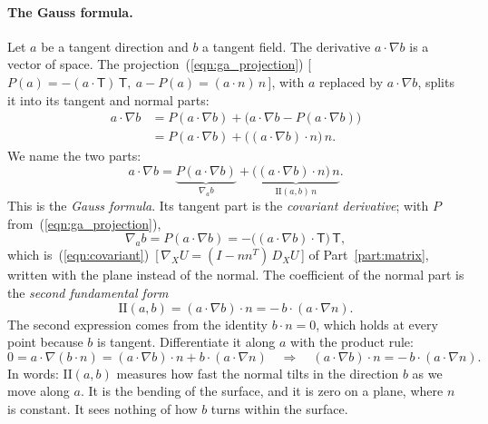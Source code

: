 \paragraph{The Gauss formula.} Let $a$ be a tangent direction and $b$ a tangent field. The derivative $a\cdot\nabla b$ is a vector of space. The projection~(\ref{eqn:ga_projection}) [\,$P(a) = -(a\cdot\mathsf T)\,\mathsf T,\ a - P(a) = (a\cdot n)\,n$\,], with $a$ replaced by $a\cdot\nabla b$, splits it into its tangent and normal parts:
\begin{align*}
a\cdot\nabla b &= P(a\cdot\nabla b) + \big(a\cdot\nabla b - P(a\cdot\nabla b)\big) \\
&= P(a\cdot\nabla b) + \big((a\cdot\nabla b)\cdot n\big)\, n .
\end{align*}
We name the two parts:
\begin{equation}
\label{eqn:ga_gauss}
a \cdot \nabla b = \underbrace{P(a \cdot \nabla b)}_{\nabla_a b} + \underbrace{\big((a \cdot \nabla b) \cdot n\big)\, n}_{\mathrm{II}(a, b)\, n} .
\end{equation}
This is the \emph{Gauss formula}. Its tangent part is the \emph{covariant derivative}; with $P$ from~(\ref{eqn:ga_projection}),
\begin{equation*}
\nabla_a b = P(a\cdot\nabla b) = -\big((a\cdot\nabla b)\cdot\mathsf T\big)\,\mathsf T ,
\end{equation*}
which is~(\ref{eqn:covariant})~[\,$\nabla_X U = (I - nn^T)\, D_X U$\,] of Part~\ref{part:matrix}, written with the plane instead of the normal. The coefficient of the normal part is the \emph{second fundamental form}
\begin{equation*}
\mathrm{II}(a, b) = (a \cdot \nabla b) \cdot n = -\,b \cdot (a \cdot \nabla n) .
\end{equation*}
The second expression comes from the identity $b\cdot n = 0$, which holds at every point because $b$ is tangent. Differentiate it along $a$ with the product rule:
\begin{equation*}
0 = a\cdot\nabla(b\cdot n) = (a\cdot\nabla b)\cdot n + b\cdot(a\cdot\nabla n) \quad\Longrightarrow\quad (a\cdot\nabla b)\cdot n = -\,b\cdot(a\cdot\nabla n) .
\end{equation*}
In words: $\mathrm{II}(a, b)$ measures how fast the normal tilts in the direction $b$ as we move along $a$. It is the bending of the surface, and it is zero on a plane, where $n$ is constant. It sees nothing of how $b$ turns within the surface.

